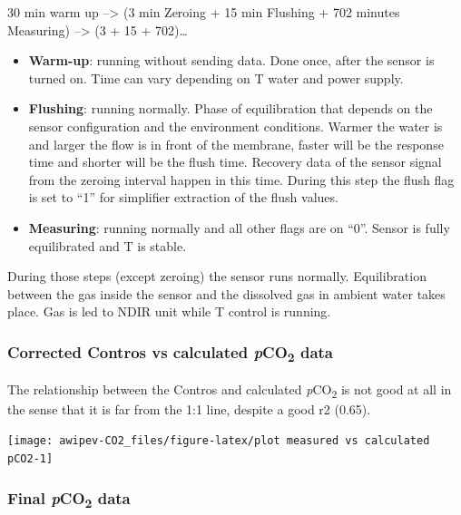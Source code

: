 \documentclass[
]{article}
\providecommand{\tightlist}{%
  \setlength{\itemsep}{0pt}\setlength{\parskip}{0pt}}
\begin{document}
30 min warm up --\textgreater{} (3 min Zeroing + 15 min Flushing + 702
minutes Measuring) --\textgreater{} (3 + 15 + 702)\ldots{}

\begin{itemize}
\tightlist
\item
  \textbf{Warm-up}: running without sending data. Done once, after the
  sensor is turned on. Time can vary depending on T water and power
  supply.
\item
  \textbf{Flushing}: running normally. Phase of equilibration that
  depends on the sensor configuration and the environment conditions.
  Warmer the water is and larger the flow is in front of the membrane,
  faster will be the response time and shorter will be the flush time.
  Recovery data of the sensor signal from the zeroing interval happen in
  this time. During this step the flush flag is set to ``1'' for
  simplifier extraction of the flush values.
\item
  \textbf{Measuring}: running normally and all other flags are on ``0''.
  Sensor is fully equilibrated and T is stable.
\end{itemize}

During those steps (except zeroing) the sensor runs normally.
Equilibration between the gas inside the sensor and the dissolved gas in
ambient water takes place. Gas is led to NDIR unit while T control is
running.

\hypertarget{corrected-contros-vs-calculated-pco2-data}{%
\subsubsection{\texorpdfstring{\textbf{Corrected Contros vs calculated
\emph{p}CO\textsubscript{2}
data}}{Corrected Contros vs calculated pCO2 data}}\label{corrected-contros-vs-calculated-pco2-data}}

The relationship between the Contros and calculated
\emph{p}CO\textsubscript{2} is not good at all in the sense that it is
far from the 1:1 line, despite a good r2 (0.65).

\begin{center}\texttt{[image: awipev-CO2\_files/figure-latex/plot measured vs calculated pCO2-1]} \end{center}

\hypertarget{final-pco2-data}{%
\subsubsection{\texorpdfstring{\textbf{Final \emph{p}CO\textsubscript{2}
data}}{Final pCO2 data}}\label{final-pco2-data}}
\end{document}
